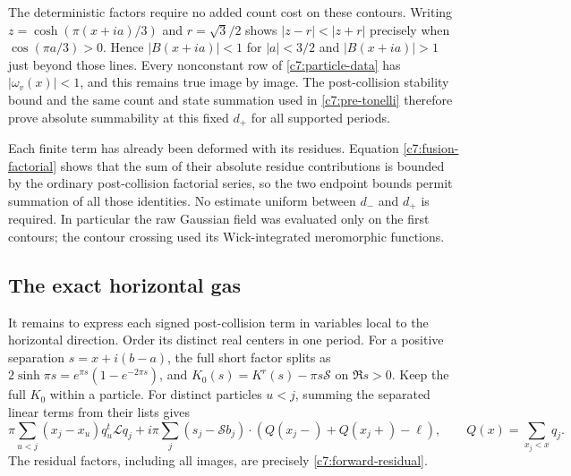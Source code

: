The deterministic factors require no added count cost on these contours.
Writing $z=\cosh(\pi(x+ia)/3)$ and $r=\sqrt3/2$ shows
$|z-r|<|z+r|$ precisely when $\cos(\pi a/3)>0$.  Hence $|B(x+ia)|<1$ for
$|a|<3/2$ and $|B(x+ia)|>1$ just beyond those lines.  Every nonconstant row
of \eqref{c7:particle-data} has $|\omega_v(x)|<1$, and this remains true
image by image.  The post-collision stability bound and the same count and
state summation used in \eqref{c7:pre-tonelli} therefore prove absolute
summability at this fixed $d_+$ for all supported periods.

Each finite term has already been deformed with its residues.  Equation
\eqref{c7:fusion-factorial} shows that the sum of their absolute residue
contributions is bounded by the ordinary post-collision factorial series,
so the two endpoint bounds permit summation of all those identities.  No
estimate uniform between $d_-$ and $d_+$ is required.  In particular the
raw Gaussian field was evaluated only on the first contours; the contour
crossing used its Wick-integrated meromorphic functions.

\subsection{The exact horizontal gas}

It remains to express each signed post-collision term in variables local to
the horizontal direction.  Order its distinct real centers in one period.
For a positive separation $s=x+i(b-a)$, the full short factor splits as
$2\sinh\pi s=e^{\pi s}(1-e^{-2\pi s})$, and
$K_0(s)=K^r(s)-\pi s\mathcal S$ on $\Re s>0$.  Keep the full $K_0$ within a
particle.  For distinct particles $u<j$, summing the separated linear terms
from their lists gives
\[
\pi\sum_{u<j}(x_j-x_u)q_u^t\mathcal Lq_j
+i\pi\sum_j(s_j-\mathcal S b_j)\cdot
     (Q(x_j-)+Q(x_j+)-\boldsymbol\ell),
\qquad Q(x)=\sum_{x_j<x}q_j.
\]
The residual factors, including all images, are precisely
\eqref{c7:forward-residual}.

